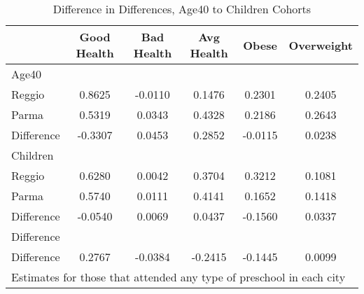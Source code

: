 \begin{table}[htbp]\centering
\caption{Difference in Differences, Age40 to Children Cohorts}
\begin{tabular}{l*{5}{c}}
\hline\hline
            & Good Health&  Bad Health&  Avg Health&       Obese&  Overweight\\
\hline
Age40       &            &            &            &            &            \\
Reggio      &      0.8625&     -0.0110&      0.1476&      0.2301&      0.2405\\
Parma       &      0.5319&      0.0343&      0.4328&      0.2186&      0.2643\\
Difference  &     -0.3307&      0.0453&      0.2852&     -0.0115&      0.0238\\
\hline
Children    &            &            &            &            &            \\
Reggio      &      0.6280&      0.0042&      0.3704&      0.3212&      0.1081\\
Parma       &      0.5740&      0.0111&      0.4141&      0.1652&      0.1418\\
Difference  &     -0.0540&      0.0069&      0.0437&     -0.1560&      0.0337\\
\hline
Difference  &            &            &            &            &            \\
Difference  &      0.2767&     -0.0384&     -0.2415&     -0.1445&      0.0099\\
\hline\hline
\multicolumn{6}{l}{\footnotesize Estimates for those that attended any type of preschool in each city}\\
\end{tabular}
\end{table}
